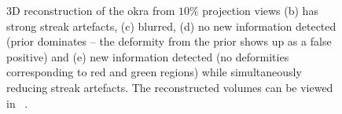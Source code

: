 \documentclass[journal]{IEEEtran}
\begin{document}
\begin{figure}[!h]
\caption{3D reconstruction of the okra from $10\%$ projection
  views (b) has strong streak artefacts, (c) blurred, (d) no new
  information detected (prior dominates -- the deformity from the prior
  shows up as a false positive) and (e) new information detected (no deformities
  corresponding to red and green regions) while simultaneously
  reducing streak artefacts. The reconstructed volumes can be viewed in ~\cite{supp_paper}.}
\label{fig:okra_3D_results}
\end{figure}

\end{document}
